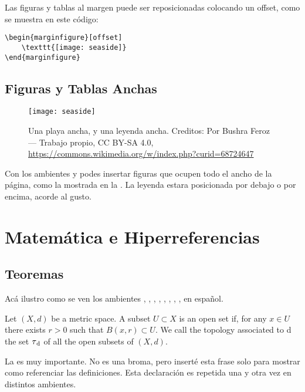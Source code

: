 Las figuras y tablas al margen puede ser reposicionadas colocando un offset, como se muestra en este código:
    
\begin{lstlisting}
\begin{marginfigure}[offset]
    \texttt{[image: seaside]}
\end{marginfigure}
\end{lstlisting}

\subsection{Figuras y Tablas Anchas}

\begin{figure*}[h!]
	\texttt{[image: seaside]}
    \caption[Una playa ancha]{Una playa ancha, y una leyenda ancha. Creditos: Por Bushra Feroz --- Trabajo propio, CC BY-SA 4.0, \url{https://commons.wikimedia.org/w/index.php?curid=68724647}}
\end{figure*}

Con los ambientes  y  podes insertar figuras que ocupen todo el ancho de la página, como la mostrada en la . La leyenda estara posicionada por debajo o por encima, acorde al gusto.

\section{Matemática e Hiperreferencias}
\subsection{Teoremas}
Acá ilustro como se ven los ambientes , , , , , , , , en español.

\begin{definition}
    Let $(X, d)$ be a metric space. A subset $U \subset X$ is an open set if, for any $x \in U$ there exists $r > 0$ such that $B(x, r) \subset U$. We call the topology associated to d the set $\tau\textsubscript{d}$ of all the open subsets of $(X, d).$
\end{definition}

La  es muy importante. No es una broma, pero inserté esta frase solo para mostrar como referenciar las definiciones. Esta declaración es repetida una y otra vez en distintos ambientes.

